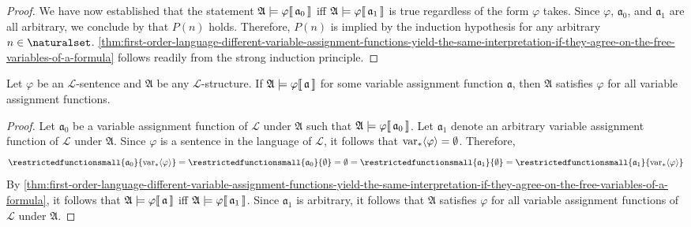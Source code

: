 \begin{proof}
    \vspace{0.3cm}
    \noindent
    We have now established that the statement \(  \mathfrak{A} \models \varphi\llbracket\, \mathfrak{a}_{0} \,\rrbracket \) iff \(  \mathfrak{A} \models \varphi\llbracket\, \mathfrak{a}_{1} \,\rrbracket \)
    is true regardless of the form \( \varphi \) takes. Since \( \varphi \), \( \mathfrak{a}_{0} \), and \( \mathfrak{a}_{1} \) are all arbitrary, we conclude by
     that \( P(n) \) holds.
    Therefore, \( P(n) \) is implied by the induction hypothesis for any arbitrary \( n \in \naturalset \).
    \cref{thm:first-order-language-different-variable-assignment-functions-yield-the-same-interpretation-if-they-agree-on-the-free-variables-of-a-formula} follows
    readily from the strong induction principle.
\end{proof}

\begin{thm}
     \label{thm:first-order-language-sentences-must-be-satisfied-by-all-variable-assignment-functions}
    Let \( \varphi \) be an \( \mathcal{L} \)-sentence and \( \mathfrak{A} \) be any \( \mathcal{L} \)-structure.
    If \(  \mathfrak{A} \models \varphi\llbracket\, \mathfrak{a} \,\rrbracket \) for some variable assignment function \( \mathfrak{a} \),
    then \( \mathfrak{A} \) satisfies \( \varphi \) for all variable assignment functions.
\end{thm}

\begin{proof}
    Let \( \mathfrak{a}_{0} \) be a variable assignment function of \( \mathcal{L} \) under \( \mathfrak{A} \) such that
    \(  \mathfrak{A} \models \varphi\llbracket\, \mathfrak{a}_{0} \,\rrbracket \).
    Let \( \mathfrak{a}_{1} \) denote an arbitrary variable assignment function of \( \mathcal{L} \) under \( \mathfrak{A} \).
    Since \( \varphi \) is a sentence in the language of \( \mathcal{L} \), it follows that \( \operatorname{var}_{\ast} \langle\varphi\rangle = \emptyset \).
    Therefore,
    \begin{equation*}
        \restrictedfunctionsmall{\mathfrak{a}_{0}}{ \folfreevars{\varphi} }
        = \restrictedfunctionsmall{\mathfrak{a}_{0}}{ \emptyset }
        = \emptyset
        = \restrictedfunctionsmall{\mathfrak{a}_{1}}{ \emptyset }
        = \restrictedfunctionsmall{\mathfrak{a}_{1}}{ \folfreevars{\varphi} }
    \end{equation*}
    By \cref{thm:first-order-language-different-variable-assignment-functions-yield-the-same-interpretation-if-they-agree-on-the-free-variables-of-a-formula},
    it follows that \(  \mathfrak{A} \models \varphi\llbracket\, \mathfrak{a} \,\rrbracket \) iff \(  \mathfrak{A} \models \varphi\llbracket\, \mathfrak{a}_{1} \,\rrbracket \).
    Since \( \mathfrak{a}_{1} \) is arbitrary, it follows that \( \mathfrak{A} \) satisfies \( \varphi \) for all variable assignment functions of \( \mathcal{L} \)
    under \( \mathfrak{A} \).
\end{proof}

